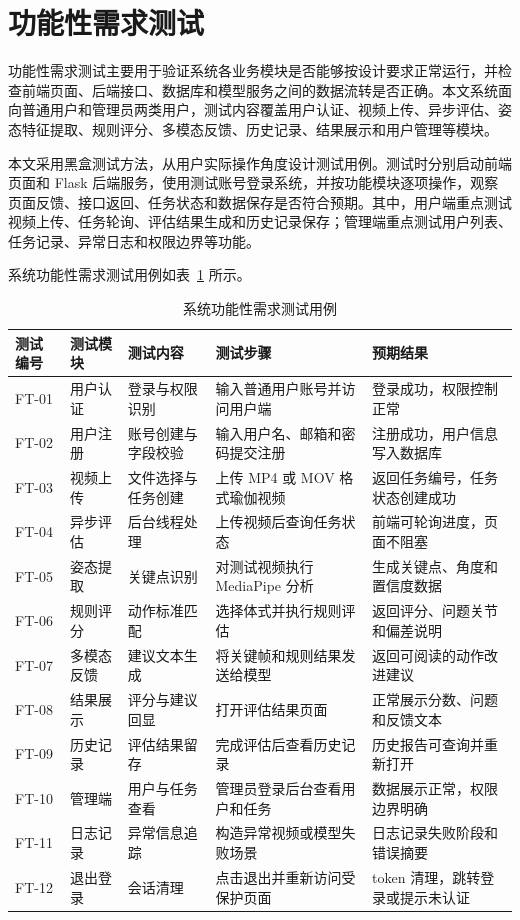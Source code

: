 \documentclass[UTF8,twoside]{ctexrep}
\makeatletter
\def@NAT@last@yr{\@citea}%
\def@NAT@last@yr{-\NAT@penalty}%
\makeatother
\begin{document}
\section{功能性需求测试}
功能性需求测试主要用于验证系统各业务模块是否能够按设计要求正常运行，并检查前端页面、后端接口、数据库和模型服务之间的数据流转是否正确。本文系统面向普通用户和管理员两类用户，测试内容覆盖用户认证、视频上传、异步评估、姿态特征提取、规则评分、多模态反馈、历史记录、结果展示和用户管理等模块。

本文采用黑盒测试方法，从用户实际操作角度设计测试用例。测试时分别启动前端页面和 Flask 后端服务，使用测试账号登录系统，并按功能模块逐项操作，观察页面反馈、接口返回、任务状态和数据保存是否符合预期。其中，用户端重点测试视频上传、任务轮询、评估结果生成和历史记录保存；管理端重点测试用户列表、任务记录、异常日志和权限边界等功能。

系统功能性需求测试用例如表~\ref{tab:function_test} 所示。

\begin{table}[H]
  \centering
  \caption{系统功能性需求测试用例}
  \label{tab:function_test}
  \begin{tabular}{p{1.35cm}p{2.0cm}p{2.5cm}p{4.0cm}p{3.0cm}}
    \toprule
    测试编号 & 测试模块 & 测试内容 & 测试步骤 & 预期结果 \\
    \midrule
    FT-01 & 用户认证 & 登录与权限识别 & 输入普通用户账号并访问用户端 & 登录成功，权限控制正常 \\
    FT-02 & 用户注册 & 账号创建与字段校验 & 输入用户名、邮箱和密码提交注册 & 注册成功，用户信息写入数据库 \\
    FT-03 & 视频上传 & 文件选择与任务创建 & 上传 MP4 或 MOV 格式瑜伽视频 & 返回任务编号，任务状态创建成功 \\
    FT-04 & 异步评估 & 后台线程处理 & 上传视频后查询任务状态 & 前端可轮询进度，页面不阻塞 \\
    FT-05 & 姿态提取 & 关键点识别 & 对测试视频执行 MediaPipe 分析 & 生成关键点、角度和置信度数据 \\
    FT-06 & 规则评分 & 动作标准匹配 & 选择体式并执行规则评估 & 返回评分、问题关节和偏差说明 \\
    FT-07 & 多模态反馈 & 建议文本生成 & 将关键帧和规则结果发送给模型 & 返回可阅读的动作改进建议 \\
    FT-08 & 结果展示 & 评分与建议回显 & 打开评估结果页面 & 正常展示分数、问题和反馈文本 \\
    FT-09 & 历史记录 & 评估结果留存 & 完成评估后查看历史记录 & 历史报告可查询并重新打开 \\
    FT-10 & 管理端 & 用户与任务查看 & 管理员登录后台查看用户和任务 & 数据展示正常，权限边界明确 \\
    FT-11 & 日志记录 & 异常信息追踪 & 构造异常视频或模型失败场景 & 日志记录失败阶段和错误摘要 \\
    FT-12 & 退出登录 & 会话清理 & 点击退出并重新访问受保护页面 & token 清理，跳转登录或提示未认证 \\
    \bottomrule
  \end{tabular}
\end{table}
\end{document}
